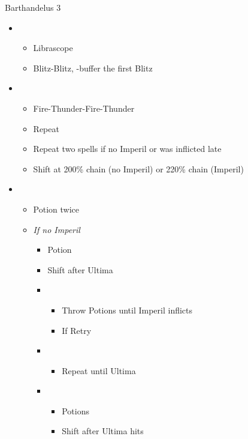 \begin{battle}{Barthandelus 3}
\begin{multicols}{2}
\begin{itemize}
    \item \second
    \begin{itemize}
        \item Librascope
        \item Blitz-Blitz, \rav-buffer the first Blitz
    \end{itemize}
    \item \fifth
    \begin{itemize}
        \item Fire-Thunder-Fire-Thunder
        \item Repeat
        \item Repeat two spells if no Imperil or was inflicted late
        \item Shift at 200\% chain (no Imperil) or 220\% chain (Imperil)
    \end{itemize}
    \item \third
    \begin{itemize}
        \item Potion twice
        \item \textit{If no Imperil}
        \begin{itemize}
            \item Potion
            \item Shift after Ultima
            \item \fifth
            \begin{itemize}
                \item Throw Potions until Imperil inflicts
                \item If \stagger Retry
            \end{itemize}
            \item \first
            \begin{itemize}
                \item Repeat until Ultima
            \end{itemize}
            \item \third
            \begin{itemize}
                \item Potions
                \item Shift after Ultima hits
            \end{itemize}
        \end{itemize}

\end{itemize}
\end{itemize}
\end{multicols}
\end{battle}
